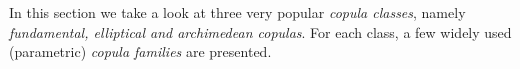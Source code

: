 
In this section we take a look at three very popular \textit{copula classes}, namely \textit{fundamental, elliptical and archimedean copulas}. For each class, a few widely used (parametric) \textit{copula families} are presented.